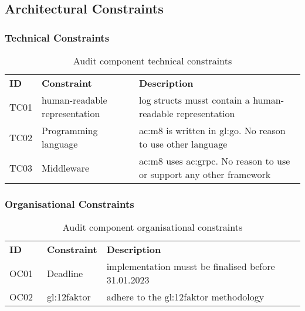 \subsection{Architectural Constraints}

\subsubsection{Technical Constraints}

\begin{table}[H]
  \begin{center}
    \caption{Audit component technical constraints}
    \label{tab:actc}
    \def\arraystretch{1.5}
    \begin{tabularx}{\linewidth}{|l l X |}
      \hline
      \rowcolor{gray!20}
      \textbf{ID} & \textbf{Constraint} & \textbf{Description}\\
      TC01 & human-readable representation & log structs musst contain a human-readable representation\\
      TC02 & Programming language & \gls{ac:m8} is written in \gls{gl:go}. No reason to use other language\\
      TC03\label{tc:ac03} & Middleware & \gls{ac:m8} uses \gls{ac:grpc}. No reason to use or support any other framework\\
      \hline
    \end{tabularx}
  \end{center}
\end{table}

\subsubsection{Organisational Constraints}

\begin{table}[H]
  \begin{center}
    \caption{Audit component organisational constraints}
    \label{tab:acoc}
    \def\arraystretch{1.5}
    \begin{tabularx}{\linewidth}{|l l X |}
      \hline
      \rowcolor{gray!20}
      \textbf{ID} & \textbf{Constraint} & \textbf{Description}\\
      OC01 & Deadline & implementation musst be finalised before 31.01.2023\\
      OC02~\label{oc:ac02} & \gls{gl:12faktor} & adhere to the \gls{gl:12faktor} methodology\\
      \hline
    \end{tabularx}
  \end{center}
\end{table}

